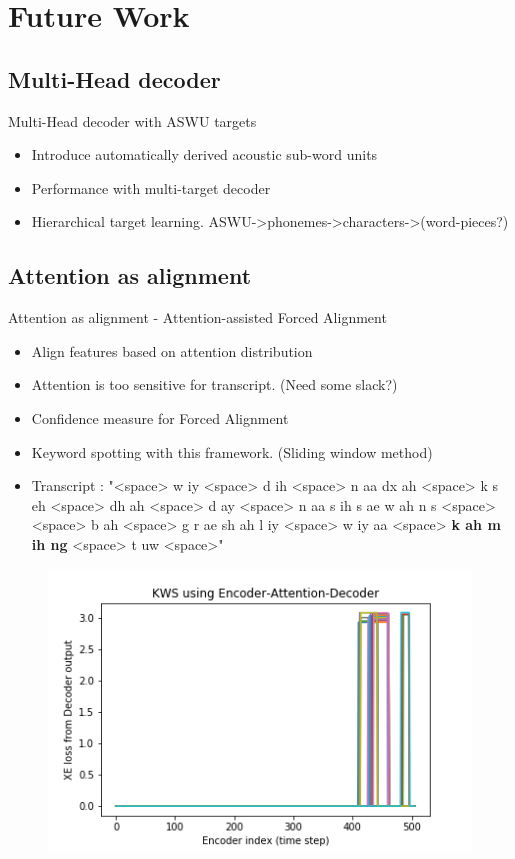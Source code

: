 \documentclass[10pt]{beamer}
\begin{document}
\section{Future Work}

\subsection{Multi-Head decoder}
\begin{frame}[fragile]{Multi-Head decoder with ASWU targets}
\begin{itemize}
	\item Introduce automatically derived acoustic sub-word units
	\item Performance with multi-target decoder
	\item Hierarchical target learning. ASWU->phonemes->characters->(word-pieces?)
\end{itemize}
\end{frame}

\subsection{Attention as alignment}
\begin{frame}[fragile]{Attention as alignment - Attention-assisted Forced Alignment}
\begin{itemize}
	\item Align features based on attention distribution
	\item Attention is too sensitive for transcript. (Need some slack?)
	\item Confidence measure for Forced Alignment
	\item Keyword spotting with this framework. (Sliding window method)
	\item Transcript : "<space> w iy <space> d ih <space> n aa dx ah <space> k s eh <space> dh ah <space> d ay <space> n aa s ih s ae w ah n s <space> <space> b ah <space> g r ae sh ah l iy <space> w iy aa <space> \textbf{k ah m ih ng} <space> t uw <space>"
\end{itemize}
\begin{figure}
	\includegraphics[height=0.4\textheight]{./kws.png}
\end{figure}

\end{frame}
\end{document}
